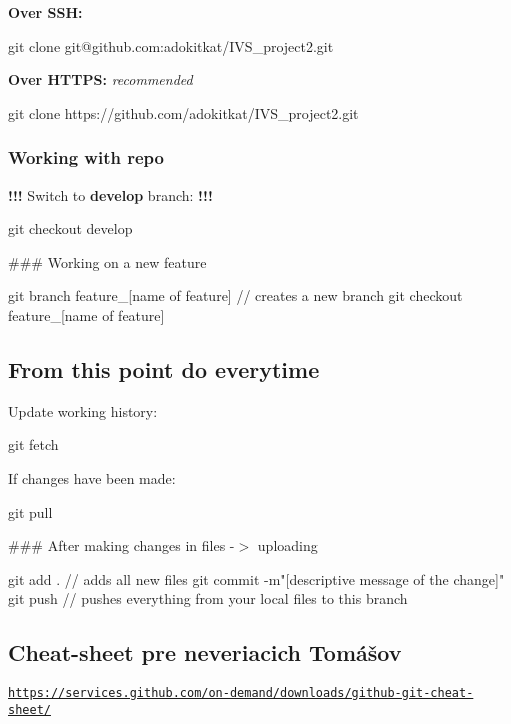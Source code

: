 {\bfseries Over S\+SH\+:} 
\begin{DoxyCode}
git clone git@github.com:adokitkat/IVS\_project2.git
\end{DoxyCode}
 {\bfseries Over H\+T\+T\+PS\+:} {\itshape recommended} 
\begin{DoxyCode}
git clone https://github.com/adokitkat/IVS\_project2.git
\end{DoxyCode}
 \subsubsection*{Working with repo}

{\bfseries !!!} Switch to {\bfseries develop} branch\+: {\bfseries !!!} 
\begin{DoxyCode}
git checkout develop
\end{DoxyCode}
 \#\#\# Working on a new feature 
\begin{DoxyCode}
git branch feature\_[name of feature]    // creates a new branch
git checkout feature\_[name of feature]
\end{DoxyCode}


\subsection*{From this point do everytime}

Update working history\+: 
\begin{DoxyCode}
git fetch
\end{DoxyCode}
 If changes have been made\+: 
\begin{DoxyCode}
git pull
\end{DoxyCode}
 \#\#\# After making changes in files -\/$>$ uploading 
\begin{DoxyCode}
git add .                                           // adds all new files
git commit -m"[descriptive message of the change]"
git push                                            // pushes everything from your local files to this
       branch
\end{DoxyCode}


\subsection*{Cheat-\/sheet pre neveriacich Tomášov}

\href{https://services.github.com/on-demand/downloads/github-git-cheat-sheet/}{\tt https\+://services.\+github.\+com/on-\/demand/downloads/github-\/git-\/cheat-\/sheet/} 